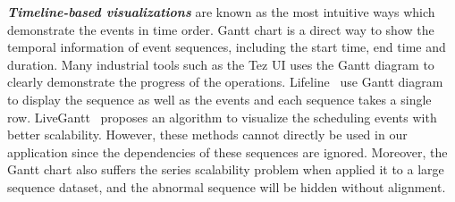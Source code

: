 \emph{\textbf{Timeline-based visualizations}} are known as the most intuitive ways which demonstrate the events in time order. Gantt chart is a direct way to show the temporal information of event sequences, including the start time, end time and duration. Many industrial tools such as the Tez UI uses the Gantt diagram to clearly demonstrate the progress of the operations. Lifeline~\cite{plaisant1996lifelines} use Gantt diagram to display the sequence as well as the events and each sequence takes a single row. LiveGantt~\cite{jo2014livegantt} proposes an algorithm to visualize the scheduling events with better scalability. However, these methods cannot directly be used in our application since the dependencies of these sequences are ignored. Moreover, the Gantt chart also suffers the series scalability problem when applied it to a large sequence dataset, and the abnormal sequence will be hidden without alignment.
